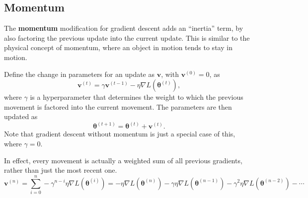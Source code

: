 \documentclass[12pt]{report}
\theoremstyle{definition}
\theoremstyle{remark}
\begin{document}
\subsection{Momentum}
The \textbf{momentum} modification for gradient descent adds an ``inertia'' term, by also factoring the previous update into the current update. This is similar to the physical concept of momentum, where an object in motion tends to stay in motion.

Define the change in parameters for an update as $\mathbf{v}$, with $\mathbf{v}^{(0)} = 0$, as
\begin{equation}
    \mathbf{v}^{(t)} = \gamma \mathbf{v}^{(t-1)} - \eta \nabla L(\boldsymbol{\theta}^{(t)}),
\end{equation}
where $\gamma$ is a hyperparameter that determines the weight to which the previous movement is factored into the current movement. The parameters are then updated as
\begin{equation}
    \boldsymbol{\theta}^{(t+1)} = \boldsymbol{\theta}^{(t)} + \mathbf{v}^{(t)}.
\end{equation}
Note that gradient descent without momentum is just a special case of this, where $\gamma = 0$.

In effect, every movement is actually a weighted sum of all previous gradients, rather than just the most recent one.
\begin{equation}
    \mathbf{v}^{(n)} = \sum_{i=0}^{n} -\gamma^{n-i} \eta\nabla L(\boldsymbol{\theta}^{(i)}) = -\eta\nabla L(\boldsymbol{\theta}^{(n)}) - \gamma \eta\nabla L(\boldsymbol{\theta}^{(n-1)}) - \gamma^2 \eta\nabla L(\boldsymbol{\theta}^{(n-2)}) - \cdots
\end{equation}
\end{document}
